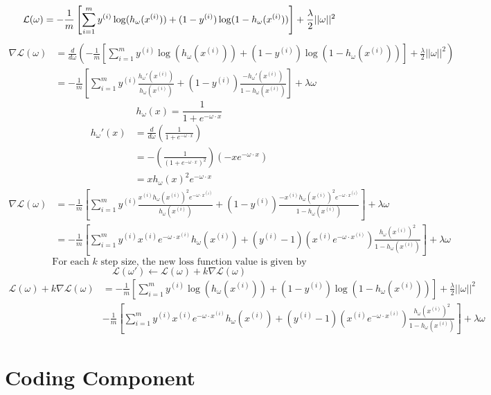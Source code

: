 \documentclass[12pt]{article}
\newenvironment{solution}[2][Solution]{\begin{trivlist}
\item[\hskip \labelsep {\bfseries #1}]}{\end{trivlist}}
\begin{document}
\begin{solution}{}~
$$\mathcal L(\omega)=-\frac{1}{m}\left[\sum_{i=1}^my^{(i)}\log(h_\omega(x^{(i)}))+(1-y^{(i)})\log(1-h_\omega(x^{(i)}))\right]+\frac{\lambda}{2}||\omega||^2\\$$
\begin{align*}
\nabla\mathcal L(\omega)&=\frac{d}{d\omega}\left(-\frac{1}{m}\left[\sum_{i=1}^my^{(i)}\log(h_\omega(x^{(i)}))+(1-y^{(i)})\log(1-h_\omega(x^{(i)}))\right]+\frac{\lambda}{2}||\omega||^2\right)\\
&=-\frac{1}{m}\left[\sum_{i=1}^my^{(i)}\frac{h_\omega'(x^{(i)})}{h_\omega(x^{(i)})}+(1-y^{(i)})\frac{-h_\omega'(x^{(i)})}{1-h_\omega(x^{(i)})}\right]+\lambda\omega
\end{align*}
$$h_\omega(x)=\frac{1}{1+e^{-\omega\cdot x}}$$
\begin{align*}
h_\omega'(x)&=\frac{d}{d\omega}\left(\frac{1}{1+e^{-\omega\cdot x}}\right)\\
&=-\left(\frac{1}{(1+e^{-\omega\cdot x})^2}\right)(-xe^{-\omega\cdot x})\\
&=xh_\omega(x)^2e^{-\omega\cdot x}
\end{align*}
\begin{align*}
\nabla\mathcal L(\omega)&=-\frac{1}{m}\left[\sum_{i=1}^my^{(i)}\frac{x^{(i)}h_\omega(x^{(i)})^2e^{-\omega\cdot x^{(i)}}}{h_\omega(x^{(i)})}+(1-y^{(i)})\frac{-x^{(i)}h_\omega(x^{(i)})^2e^{-\omega\cdot x^{(i)}}}{1-h_\omega(x^{(i)})}\right]+\lambda\omega\\
&=-\frac{1}{m}\left[\sum_{i=1}^my^{(i)}x^{(i)}e^{-\omega\cdot x^{(i)}}h_\omega(x^{(i)})+(y^{(i)}-1)(x^{(i)}e^{-\omega\cdot x^{(i)}})\frac{h_\omega(x^{(i)})^2}{1-h_\omega(x^{(i)})}\right]+\lambda\omega
\end{align*}
\pagebreak
$$\text{For each }k\text{ step size, the new loss function value is given by}$$
$$\mathcal L(\omega')\leftarrow \mathcal L(\omega)+k\nabla\mathcal L(\omega)$$
\begin{align*}
\mathcal L(\omega)+k\nabla\mathcal L(\omega)&=-\frac{1}{m}\left[\sum_{i=1}^my^{(i)}\log(h_\omega(x^{(i)}))+(1-y^{(i)})\log(1-h_\omega(x^{(i)}))\right]+\frac{\lambda}{2}||\omega||^2\\
&-\frac{1}{m}\left[\sum_{i=1}^my^{(i)}x^{(i)}e^{-\omega\cdot x^{(i)}}h_\omega(x^{(i)})+(y^{(i)}-1)(x^{(i)}e^{-\omega\cdot x^{(i)}})\frac{h_\omega(x^{(i)})^2}{1-h_\omega(x^{(i)})}\right]+\lambda\omega
\end{align*}
\end{solution}

\section{Coding Component}
\end{document}
